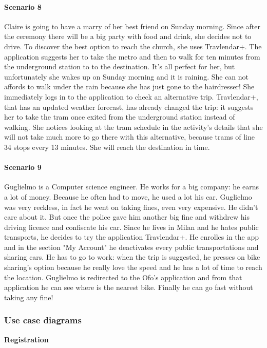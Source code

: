 \documentclass[12pt,titlepage]{article}
\begin{document}
\paragraph{Scenario 8}
Claire is going to have a marry of her best friend on Sunday morning. Since after the ceremony there will be a big party with food and drink, she decides not to drive. To discover the best option to reach the church, she uses Travlendar+. The application suggests her to take the metro and then to walk for ten minutes from the underground station to to the destination. It's all perfect for her, but unfortunately she wakes up on Sunday morning and it is raining. She can not affords to walk under the rain because she has just gone to the hairdresser! She immediately logs in to the application to check an alternative trip. Travlendar+, that has an updated weather forecast, has already changed the trip: it suggests her to take the tram once exited from the underground station instead of walking. She notices looking at the tram schedule in the activity's details that she will not take much more to go there with this alternative, because trams of line 34 stops every 13 minutes. She will reach the destination in time.

\paragraph{Scenario 9}
Guglielmo is a Computer science engineer. He works for a big company: he earns a lot of money. Because he often had to move, he used a lot his car. Guglielmo was very reckless, in fact he went on taking fines, even very expensive. He didn't care about it. But once the police gave him another big fine and withdrew his driving licence and confiscate his car.
Since he lives in Milan and he hates public transports, he decides to try the application Travlendar+. He enrolles in the app and in the section "My Account" he deactivates every public transportations and sharing cars. He has to go to work: when the trip is suggested, he presses on bike sharing's option because he really love the speed and he has a lot of time to reach the location. Guglielmo is redirected to the Ofo's application and from that application he can see where is the nearest bike. Finally he can go fast without taking any fine!




\pagebreak
\subsubsection{Use case diagrams}\label{sec:mod1}
\begin{flushleft}
\textbf{Registration} 
\end{flushleft}
\end{document}
